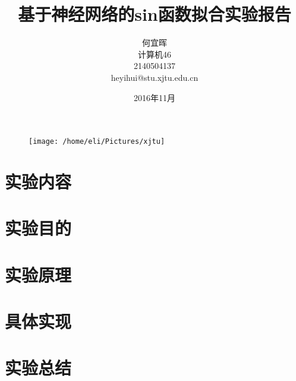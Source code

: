 \documentclass{article}
\date{2016年11月}
\title{基于神经网络的sin函数拟合实验报告}
\author{何宜晖\\计算机46\\2140504137\\heyihui@stu.xjtu.edu.cn}
\begin{document}
\begin{CJK}{UTF8}{gkai}
\begin{figure}
\centering
\texttt{[image: /home/eli/Pictures/xjtu]}
\end{figure}


\maketitle
\clearpage
\section{实验内容}
\section{实验目的}

\section{实验原理}

\section{具体实现}

\section{实验总结}

{\small
	
	
}
\end{CJK}
\end{document}
